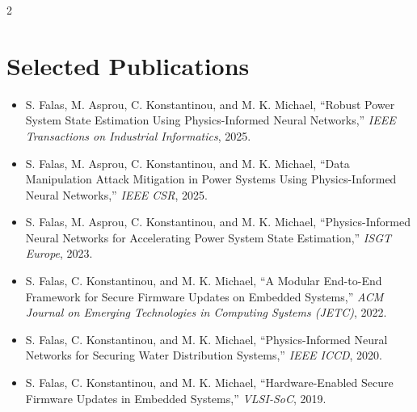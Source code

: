 \documentclass[10pt,a4paper]{article}
\begin{document}
\begin{multicols}{2}
\section*{Selected Publications}
\footnotesize
\begin{itemize}
  \item S. Falas, M. Asprou, C. Konstantinou, and M. K. Michael, ``Robust Power System State Estimation Using Physics-Informed Neural Networks,'' \textit{IEEE Transactions on Industrial Informatics}, 2025.
  \item S. Falas, M. Asprou, C. Konstantinou, and M. K. Michael, ``Data Manipulation Attack Mitigation in Power Systems Using Physics-Informed Neural Networks,'' \textit{IEEE CSR}, 2025.
  \item S. Falas, M. Asprou, C. Konstantinou, and M. K. Michael, ``Physics-Informed Neural Networks for Accelerating Power System State Estimation,'' \textit{ISGT Europe}, 2023.
  \item S. Falas, C. Konstantinou, and M. K. Michael, ``A Modular End-to-End Framework for Secure Firmware Updates on Embedded Systems,'' \textit{ACM Journal on Emerging Technologies in Computing Systems (JETC)}, 2022.
  \item S. Falas, C. Konstantinou, and M. K. Michael, ``Physics-Informed Neural Networks for Securing Water Distribution Systems,'' \textit{IEEE ICCD}, 2020.
  \item S. Falas, C. Konstantinou, and M. K. Michael, ``Hardware-Enabled Secure Firmware Updates in Embedded Systems,'' \textit{VLSI-SoC}, 2019.
\end{itemize}
\normalsize

\end{multicols}
\end{document}

